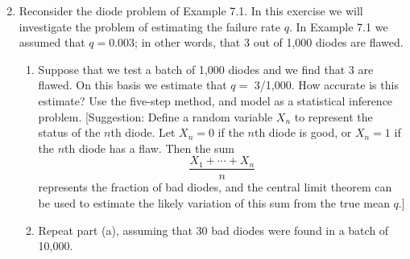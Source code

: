\documentclass[12pt, oneside]{book}
\newenvironment{solution}{\textit{Solution.}}
\newcommand{\sol}[1]{
    \begin{customframedproof}[linecolor=orangehdx!75,]
        \begin{solution}
        #1
        \end{solution}
    \end{customframedproof}
}
\begin{document}
\begin{enumerate}
    \setcounter{enumi}{1}
    \item Reconsider the diode problem of Example 7.1. In this exercise we will investigate the problem of estimating the failure rate \(q\). In Example 7.1 we assumed that \(q = 0.003\); in other words, that 3 out of 1,000 diodes are flawed.
    \begin{enumerate}
        \item Suppose that we test a batch of 1,000 diodes and we find that 3 are flawed. On this basis we estimate that \(q =\) 3/1,000. How accurate is this estimate? Use the five-step method, and model as a statistical inference problem. [Suggestion: Define a random variable \(X_{n}\) to represent the status of the \(n\)th diode. Let \(X_{n} = 0\) if the \(n\)th diode is good, or \(X_{n} = 1\) if the \(n\)th diode has a flaw. Then the sum
        \[
            \frac{X_{1} + \cdots + X_{n}}{n}
        \]
        represents the fraction of bad diodes, and the central limit theorem can be used to estimate the likely variation of this sum from the true mean \(q\).]
        \item Repeat part (a), assuming that 30 bad diodes were found in a batch of 10,000.


\end{enumerate}
\end{enumerate}
\end{document}
